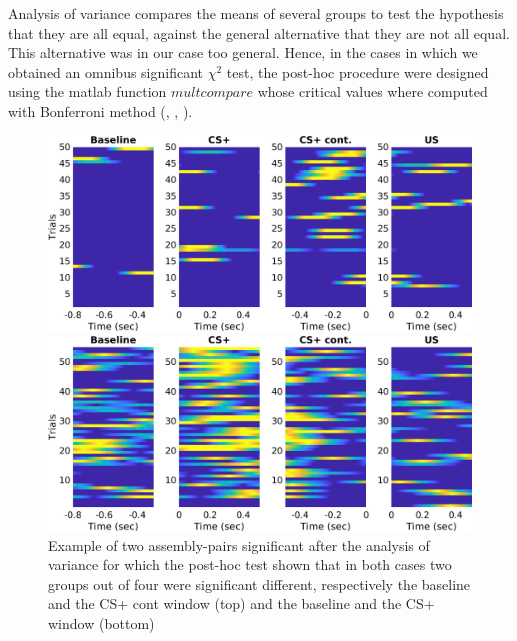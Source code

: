 Analysis of variance compares the means of several groups to test the hypothesis that they are all equal, against the general alternative that they are not all equal. This alternative was in our case too general. Hence, in the cases in which we obtained an omnibus significant $\chi^2$ test, the post-hoc procedure were designed using the matlab function $\textit{multcompare}$ whose critical values where computed with Bonferroni method (\cite{Bonferroni}, \cite{Dunn1958}, \cite{Dunn1961}).\\
\begin{figure}
    \centering
    \includegraphics[scale=0.38]{figures/SPN_DANexPreRew.png}
    
   \vspace{1cm}
   
   \includegraphics[scale=0.38]{figures/SPN_DANexStim1.png}
    \caption{Example of two assembly-pairs significant after the analysis of variance for which the post-hoc test shown that in both cases two groups out of four were significant different, respectively the baseline and the CS+ cont window (top) and the baseline and the CS+ window (bottom) }
    \label{fig:SPN_Ex}
\end{figure}
